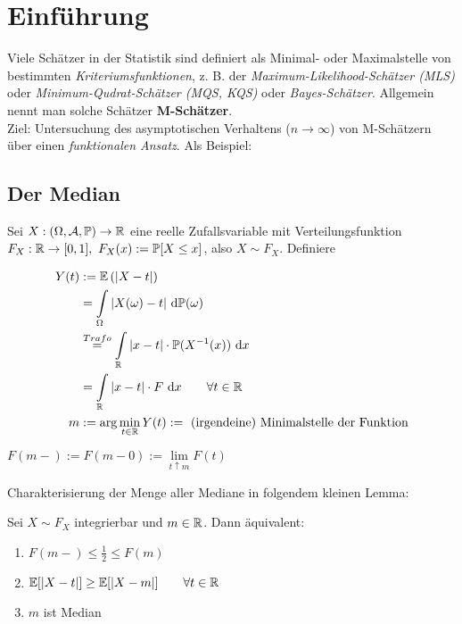 \chapter{Einführung}
Viele Schätzer in der Statistik sind definiert als Minimal- oder Maximalstelle von bestimmten \textit{Kriteriumsfunktionen}, z. B. der \textit{Maximum-Likelihood-Schätzer (MLS)} oder \textit{Minimum-Qudrat-Schätzer (MQS, KQS)} oder \textit{Bayes-Schätzer}. Allgemein nennt man solche Schätzer \textbf{M-Schätzer}.\\
Ziel: Untersuchung des asymptotischen Verhaltens ($n\to\infty$) von M-Schätzern über einen \textit{funktionalen Ansatz}. Als Beispiel:

\section{Der Median}
Sei $X:(\Omega,\mathcal{A},\mathbb{P})\to\mathbb{R}$ eine reelle Zufallsvariable mit Verteilungsfunktion\\ $F_X:\mathbb{R}\to[0,1],~F_X(x):=\mathbb{P}[X\leq x]$, also $X\sim F_X$. Definiere

\begin{align}
Y(t)&:=\mathbb{E}\left(|X-t|\right)\label{DefY}\\ \nonumber
&=\int\limits_\Omega |X(\omega)-t|\text{ d}\mathbb{P}(\omega)\\ \nonumber
&\stackrel{Trafo}{=}\int\limits_{\mathbb{R}}|x-t|\cdot\mathbb{P}(X^{-1}(x))\text{ d} x\\ \nonumber
&=\int\limits_{\mathbb{R}}|x-t|\cdot F\text{ d} x \nonumber
\qquad\forall t\in\mathbb{R}\\
m&:=\arg\min\limits_{t\in\mathbb{R}}Y(t):=\text{ (irgendeine) Minimalstelle der Funktion}\nonumber
\end{align} 

\begin{notation}
$F(m-):=F(m-0):=\lim\limits_{t\uparrow m} F(t)$
\end{notation}

Charakterisierung der Menge aller Mediane in folgendem kleinen Lemma:

\begin{lemma}\label{lemmaMedian}
Sei $X\sim F_X$ integrierbar und $m\in\mathbb{R}$. Dann äquivalent:
\begin{enumerate}[label=(\alph*)]
\item $F(m-)\leq\frac{1}{2}\leq F(m)$
\item $\mathbb{E}[|X-t|]\geq\mathbb{E}[|X-m|]\qquad\forall t\in\mathbb{R}$
\item $m$ ist Median
\end{enumerate}
\end{lemma}

